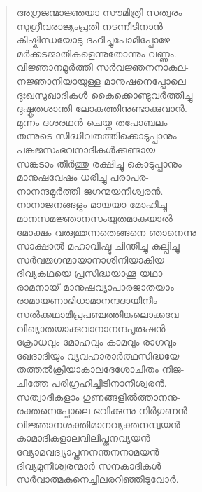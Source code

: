 \begin{verse}
അഗ്രജന്മാജ്ഞയാ സൗമിത്രി സത്വരം\\
സുഗ്രീവരാജ്യംപ്രതി നടന്നീടിനാന്‍\\
കിഷ്കിന്ധയോടു ദഹിച്ചുപോമിപ്പോഴേ\\
മര്‍ക്കടജാതികളെന്നുതോന്നും വണ്ണം.\\
വിജ്ഞാനമൂര്‍ത്തി സര്‍വജ്ഞനനാകുല-\\
നജ്ഞാനിയായുള്ള മാനുഷനെപ്പോലെ\\
ദുഃഖസുഖാദികള്‍ കൈക്കൊണ്ടുവര്‍ത്തിച്ചു\\
ദുഷ്കൃതശാന്തി ലോകത്തിനുണ്ടാക്കുവാന്‍.\\
മുന്നം ദശരഥന്‍ ചെയ്ത തപോബലം\\
തന്നുടെ സിദ്ധിവരുത്തിക്കൊടുപ്പാനും\\
പങ്കജസംഭവനാദികള്‍ക്കുണ്ടായ\\
സങ്കടാം തീര്‍ത്തു രക്ഷിച്ചു കൊടുപ്പാനും\\
മാനുഷവേഷം ധരിച്ചു പരാപര-\\
നാനന്ദമൂര്‍ത്തി ജഗന്മയനീശ്വരന്‍.\\
നാനാജനങ്ങളും മായയാ മോഹിച്ചു\\
മാനസമജ്ഞാനസംയുതമാകയാല്‍\\
മോക്ഷം വരുത്തുന്നതെങ്ങനെ ഞാനെന്നു\\
സാക്ഷാല്‍ മഹാവിഷ്ടു ചിന്തിച്ചു കല്പിച്ചു\\
സര്‍വജഗന്മായാനാശിനിയാകിയ\\
ദിവ്യകഥയെ പ്രസിദ്ധയാക്കൂ യഥാ\\
രാമനായ് മാനുഷവ്യാപാരജാതയാം\\
രാമായണാഭിധാമാനന്ദദായിനീം\\
സല്‍ക്കഥാമിപ്രപഞ്ചത്തിങ്കലൊക്കവേ\\
വിഖ്യാതയാക്കുവാനാനന്ദപൂരുഷന്‍\\
ക്രോധവും മോഹവും കാമവും രാഗവും\\
ഖേദാദിയും വ്യവഹാരാര്‍ത്ഥസിദ്ധയേ\\
തത്തല്‍ക്രിയാകാലദേശോചിതം നിജ-\\
ചിത്തേ പരിഗ്രഹിച്ചീടിനാനീശ്വരന്‍.\\
സത്വാദികളാം ഗുണങ്ങളില്‍ത്താനനു-\\
രക്തനെപ്പോലെ ഭവിക്കുന്നു നിര്‍ഗുണന്‍\\
വിജ്ഞാനശക്തിമാനവ്യക്തനന്ദ്വയന്‍\\
കാമാദികളാലവിലിപ്തനവ്യയന്‍\\
വ്യോമവദ്വ്യാപ്തനനന്തനനാമയന്‍\\
ദിവ്യമുനീശ്വരന്മാര്‍ സനകാദികള്‍\\
സര്‍വാത്മകനെച്ചിലരറിഞ്ഞീടുവോര്‍.\\

\end{verse}
